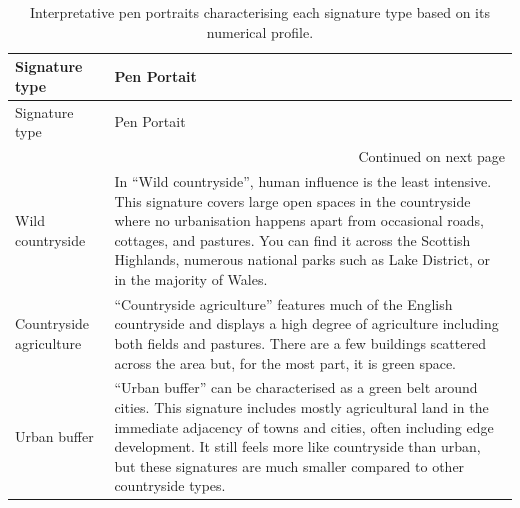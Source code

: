 \documentclass[fleqn,10pt]{wlscirep}
\begin{document}
\begin{longtable}{p{}p{}}
    \caption{\label{tab:pens}Interpretative pen portraits characterising each signature type based on its numerical profile.}\\
    \toprule
    Signature type &                                                                                                                                                                                                                                                                                                                                                                                                                             Pen Portait \\
    \midrule
    \endfirsthead
    \toprule
    Signature type &                                                                                                                                                                                                                                                                                                                                                                                                                             Pen Portait \\
    \midrule
    \endhead
    \midrule
    \multicolumn{2}{r}{{Continued on next page}} \\
    \midrule
    \endfoot
    \bottomrule
    \endlastfoot
    Wild countryside                     &                                                                                       In “Wild countryside”, human influence is the least intensive. This signature covers large open spaces in the countryside where no urbanisation happens apart from occasional roads, cottages, and pastures. You can find it across the Scottish Highlands, numerous national parks such as Lake District, or in the majority of Wales. \\
    Countryside agriculture              &                                                                                                                                                                               “Countryside agriculture” features much of the English countryside and displays a high degree of agriculture including both fields and pastures. There are a few buildings scattered across the area but, for the most part, it is green space. \\
    Urban buffer                         &                                                                                             “Urban buffer” can be characterised as a green belt around cities. This signature includes mostly agricultural land in the immediate adjacency of towns and cities, often including edge development. It still feels more like countryside than urban, but these signatures are much smaller compared to other countryside types. \\

\end{longtable}
\end{document}
